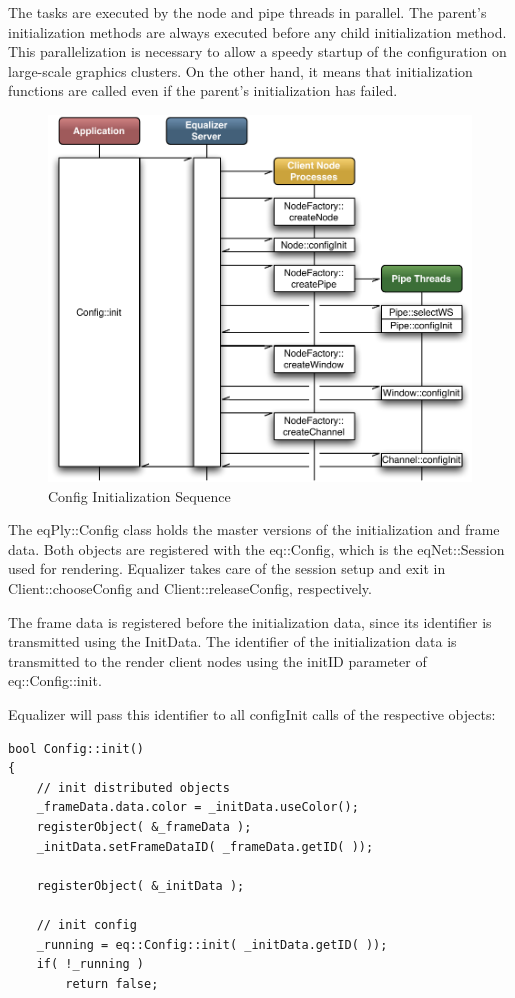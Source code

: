 \documentclass[10pt,a4]{scrartcl}
\begin{document}
The tasks are executed by the node and pipe threads in parallel. The
parent's initialization methods are always executed before any child
initialization method. This parallelization is necessary to allow a
speedy startup of the configuration on large-scale graphics clusters. On
the other hand, it means that initialization functions are called even
if the parent's initialization has failed.

\begin{figure}
  \includegraphics[width=.618\textwidth]{images/configInit.pdf}
  {\caption{\small\label{fConfigInit}Config Initialization Sequence}}
\end{figure}
The \textsf{eqPly::Config} class holds the master versions of the
initialization and frame data. Both objects are registered with the
\textsf{eq::Config}, which is the \textsf{eqNet::Session} used for
rendering. Equalizer takes care of the session setup and exit in
\textsf{Client::choose\-Config} and \textsf{Client::releaseConfig},
respectively.

The frame data is registered before the initialization data, since its
identifier is transmitted using the \textsf{InitData}. The identifier of
the initialization data is transmitted to the render client nodes using
the \textsf{initID} parameter of \textsf{eq::Config::init}.

Equalizer will pass this identifier to all \textsf{configInit} calls of
the respective objects:

{\footnotesize\begin{lstlisting}
bool Config::init()
{
    // init distributed objects
    _frameData.data.color = _initData.useColor();
    registerObject( &_frameData );
    _initData.setFrameDataID( _frameData.getID( ));

    registerObject( &_initData );

    // init config
    _running = eq::Config::init( _initData.getID( ));
    if( !_running )
        return false;
\end{lstlisting}}
\end{document}
